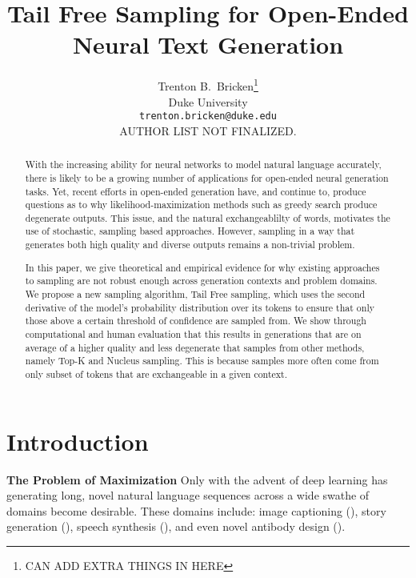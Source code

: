 \documentclass{article}
\title{Tail Free Sampling for Open-Ended Neural Text Generation}
\author{
  Trenton B.~Bricken\thanks{CAN ADD EXTRA THINGS IN HERE} \\
  Duke University\\
  \texttt{trenton.bricken@duke.edu} \\
   \AND
  AUTHOR LIST NOT FINALIZED. \\
}
\begin{document}
\maketitle

\begin{abstract}

With the increasing ability for neural networks to model natural language accurately, there is likely to be a growing number of applications for open-ended neural generation tasks. Yet, recent efforts in open-ended generation have, and continue to, produce questions as to why likelihood-maximization methods such as greedy search produce degenerate outputs. This issue, and the natural exchangeablilty of words, motivates the use of stochastic, sampling based approaches. However, sampling in a way that generates both high quality and diverse outputs remains a non-trivial problem. 
\newline

In this paper, we give theoretical and empirical evidence for why existing approaches to sampling are not robust enough across generation contexts and problem domains. We propose a new sampling algorithm, Tail Free sampling, which uses the second derivative of the model's probability distribution over its tokens to ensure that only those above a certain threshold of confidence are sampled from. We show through computational and human evaluation that this results in generations that are on average of a higher quality and less degenerate that samples from other methods, namely Top-K and Nucleus sampling. This is because samples more often come from only subset of tokens that are exchangeable in a given context.

\end{abstract}


\section{Introduction}

\textbf{The Problem of Maximization}
Only with the advent of deep learning has generating long, novel natural language sequences across a wide swathe of domains become desirable. These domains include: image captioning (\cite{ImageCap}), story generation (\cite{TopKandWritingPrompts}), speech synthesis (\cite{WaveNet}), and even novel antibody design (\cite{GiffordAntibody}).
\end{document}
